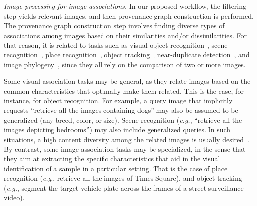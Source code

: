 

\textit{Image processing for image associations.}
In our proposed workflow, the filtering step yields relevant images, and then provenance graph construction is performed.
The provenance graph construction step involves finding diverse types of associations among images based on their similarities and/or dissimilarities.
For that reason, it is related to tasks such as visual object recognition~\cite{russakovsky_2015}, scene recognition~\cite{zhou_2017}, place recognition~\cite{lowry2016visual}, object tracking~\cite{cehovin_2016}, near-duplicate detection~\cite{winkler_2013}, and image phylogeny~\cite{Dias_2012}, since they all rely on the comparison of two or more images.

Some visual association tasks may be general, as they relate images based on the common characteristics that optimally make them related.
This is the case, for instance, for object recognition.
For example, a query image that implicitly requests ``retrieve all the images containing dogs'' may also be assumed to be generalized (any breed, color, or size).
Scene recognition (\textit{e.g.}, ``retrieve all the images depicting bedrooms'') may also include generalized queries.
In such situations, a high content diversity among the related images is usually desired~\cite{Deselaers_2009}.
By contrast, some image association tasks may be specialized, in the sense that they aim at extracting the specific characteristics that aid in the visual identification of a sample in a particular setting.
That is the case of place recognition (\textit{e.g.}, retrieve all the images of Times Square), and object tracking (\textit{e.g.}, segment the target vehicle plate across the frames of a street surveillance video).

